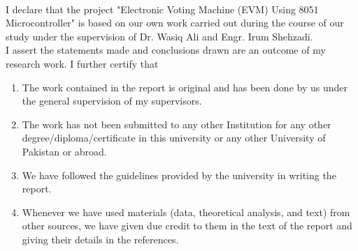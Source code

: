 


\begin{titlepage}
\begin{center}
 \\
\end{center}
  \vspace*{0.5cm}

\noindent I declare that the project "Electronic Voting Machine (EVM) Using 8051 Microcontroller" is based on our own work carried out during the course of our study under the supervision of Dr. Wasiq Ali and Engr. Irum Shehzadi. \\
I assert the statements made and conclusions drawn are an
outcome of my research work. I further certify that\\[0.2cm]

\begin{enumerate}
\item  The work contained in the report is original and has been
done by us under the general supervision of my
supervisors.

\item The work has not been submitted to any other Institution
for any other degree/diploma/certificate in this university
or any other University of Pakistan or abroad.


\item We have followed the guidelines provided by the
university in writing the report.

\item Whenever we have used materials (data, theoretical
analysis, and text) from other sources, we have given due
credit to them in the text of the report and giving their
details in the references.

\end{enumerate}


\end{titlepage}


